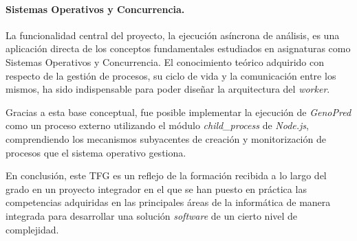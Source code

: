 \paragraph{Sistemas Operativos y Concurrencia.}
La funcionalidad central del proyecto, la ejecución asíncrona de análisis, es una aplicación directa de los conceptos fundamentales estudiados en asignaturas como Sistemas Operativos y Concurrencia. El conocimiento teórico adquirido con respecto de la gestión de procesos, su ciclo de vida y la comunicación entre los mismos, ha sido indispensable para poder diseñar la arquitectura del \textit{worker}.

Gracias a esta base conceptual, fue posible implementar la ejecución de \textit{GenoPred} como un proceso externo utilizando el módulo \textit{child\_process} de \textit{Node.js}, comprendiendo los mecanismos subyacentes de creación y monitorización de procesos que el sistema operativo gestiona.

En conclusión, este TFG es un reflejo de la formación recibida a lo largo del grado en un proyecto integrador en el que se han puesto en práctica las competencias adquiridas en las principales áreas de la informática de manera integrada para desarrollar una solución \textit{software} de un cierto nivel de complejidad.